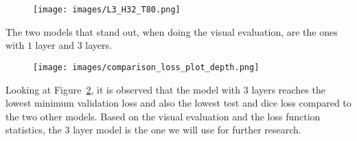 \documentclass[a4paper,12pt]{article}
\begin{document}
\begin{figure}[H]
\centering
\texttt{[image: images/L3\_H32\_T80.png]}
\caption{} %
\label{fig:n19}
\end{figure}
The two models that stand out, when doing the visual evaluation, are the ones with $1$ layer and $3$ layers.
\begin{figure}[H]
\centering
\texttt{[image: images/comparison\_loss\_plot\_depth.png]}
\caption{} %
\label{fig:n20}
\end{figure}
Looking at Figure~\ref{fig:n20}, it is observed that the model with $3$ layers reaches the lowest minimum validation loss and also the lowest test and dice loss compared to the two other models. Based on the visual evaluation and the loss function statistics, the $3$ layer model is the one we will use for further research.
\end{document}
